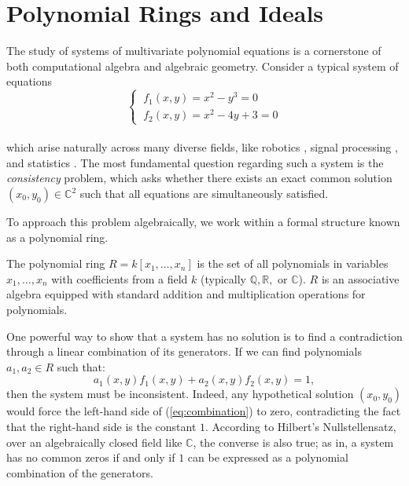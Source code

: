 \section{Polynomial Rings and Ideals}

The study of systems of multivariate polynomial equations is a cornerstone of both computational algebra and algebraic geometry. Consider a typical system of equations
\begin{equation}
\label{eq:system1}
\begin{cases}
    \ f_{1}(x,y) = x^{2} - y^{3} = 0\\
    \ f_{2}(x,y) = x^{2} - 4y + 3 = 0
\end{cases}
\end{equation} \\
which arise naturally across many diverse fields, like robotics \cite{usage_robotics1}, signal processing \cite{usage_signalprocessing1}, and statistics \cite{usage_stats1,usage_stats2}. The most fundamental question regarding such a system is the \textit{consistency} problem, which asks whether there exists an exact common solution $(x_0, y_0) \in \mathbb{C}^2$ such that all equations are simultaneously satisfied.

To approach this problem algebraically, we work within a formal structure known as a polynomial ring.

\begin{definition}
\label{def:poly_ring}
The polynomial ring $R = k[x_1, \dots, x_n]$ is the set of all polynomials in variables $x_1, \dots, x_n$ with coefficients from a field $k$ (typically $\mathbb{Q}, \mathbb{R},$ or $\mathbb{C}$). $R$ is an associative algebra equipped with standard addition and multiplication operations for polynomials.
\end{definition}

One powerful way to show that a system has no solution is to find a contradiction through a linear combination of its generators. If we can find polynomials $a_1, a_2 \in R$ such that:
\begin{equation}
\label{eq:combination}
a_{1}(x,y)f_{1}(x,y) + a_{2}(x,y)f_{2}(x,y) = 1,
\end{equation}
then the system must be inconsistent. Indeed, any hypothetical solution $(x_0, y_0)$ would force the left-hand side of (\ref{eq:combination}) to zero, contradicting the fact that the right-hand side is the constant $1$. According to Hilbert's Nullstellensatz, over an algebraically closed field like $\mathbb{C}$, the converse is also true; as in, a system has no common zeros if and only if $1$ can be expressed as a polynomial combination of the generators.

